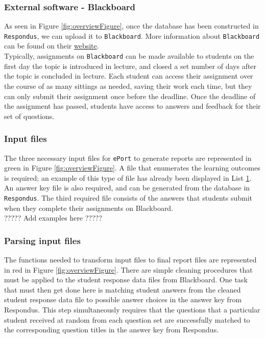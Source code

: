 \documentclass{article}\usepackage[]{graphicx}\usepackage[]{color}
\numberwithin{equation}{section} %
\begin{document}
\subsubsection{External software - Blackboard}

As seen in Figure \ref{fig:overviewFigure}, once the database has been constructed in \texttt{Respondus}, we can upload it to \texttt{Blackboard}. More information about \texttt{Blackboard} can be found on their \href{http://www.blackboard.com/}{website}.\\

Typically, assignments on \texttt{Blackboard} can be made available to students on the first day the topic is introduced in lecture, and closed a set number of days after the topic is concluded in lecture. Each student can access their assignment over the course of as many sittings as needed, saving their work each time, but they can only submit their assignment once before the deadline. Once the deadline of the assignment has passed, students have access to answers and feedback for their set of questions. 

\subsubsection{Input files}

The three necessary input files for \texttt{ePort} to generate reports are represented in green in Figure \ref{fig:overviewFigure}. A file that enumerates the learning outcomes is required; an example of this type of file has already been displayed in List \hyperref[sec:lo]{1}. An answer key file is also required, and can be generated from the database in \texttt{Respondus}. The third required file consists of the answers that students submit when they complete their assignments on Blackboard.\\

????? Add examples here ?????

\subsubsection{Parsing input files}

The functions needed to transform input files to final report files are represented in red in Figure \ref{fig:overviewFigure}. There are simple cleaning procedures that must be applied to the student response data files from Blackboard. One task that must then get done here is matching student answers from the cleaned student response data file to possible answer choices in the answer key from Respondus. This step simultaneously requires that the questions that a particular student received at random from each question set are successfully matched to the corresponding question titles in the answer key from Respondus.\\
\end{document}
